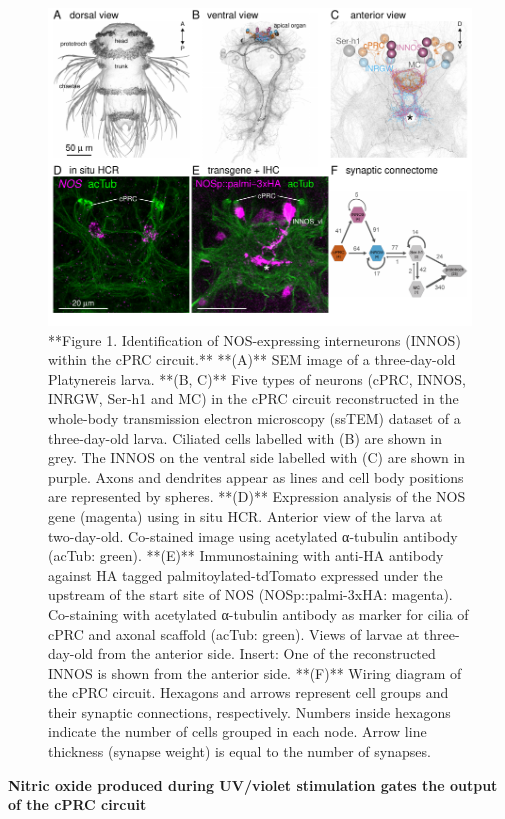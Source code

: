 \documentclass[
  10pt,
  onecolumn]{article}
\begin{document}
\begin{figure}
\includegraphics[width=25in]{figures/Fig1} \caption{**Figure 1. Identification of NOS-expressing interneurons (INNOS) within the cPRC circuit.** **(A)** SEM image of a three-day-old Platynereis larva. **(B, C)** Five types of neurons (cPRC, INNOS, INRGW, Ser-h1 and MC) in the cPRC circuit reconstructed in the whole-body transmission electron microscopy (ssTEM) dataset of a three-day-old larva. Ciliated cells labelled with (B) are shown in grey. The INNOS on the ventral side labelled with (C) are shown in purple. Axons and dendrites appear as lines and cell body positions are represented by spheres. **(D)** Expression analysis of the NOS gene (magenta) using in situ HCR. Anterior view of the larva at two-day-old. Co-stained image using acetylated α-tubulin antibody (acTub: green). **(E)** Immunostaining with anti-HA antibody against HA tagged palmitoylated-tdTomato expressed under the upstream of the start site of NOS (NOSp::palmi-3xHA: magenta). Co-staining with acetylated α-tubulin antibody as marker for cilia of cPRC and axonal scaffold (acTub: green). Views of larvae at three-day-old from the anterior side. Insert: One of the reconstructed INNOS is shown from the anterior side. **(F)** Wiring diagram of the cPRC circuit. Hexagons and arrows represent cell groups and their synaptic connections, respectively. Numbers inside hexagons indicate the number of cells grouped in each node. Arrow line thickness (synapse weight) is equal to the number of synapses.}\label{fig:unnamed-chunk-2}
\end{figure}

\textbf{Nitric oxide produced during UV/violet stimulation gates the
output of the cPRC circuit}
\end{document}
